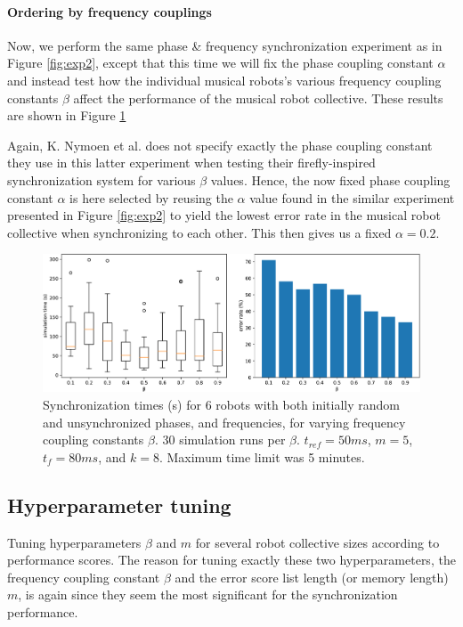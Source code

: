 		
		\paragraph{Ordering by frequency couplings}
		
		Now, we perform the same phase \& frequency synchronization experiment as in Figure \ref{fig:exp2}, except that this time we will fix the phase coupling constant $\alpha$ and instead test how the individual musical robots's various frequency coupling constants $\beta$ affect the performance of the musical robot collective. These results are shown in Figure \ref{fig:exp3}
		
		Again, K. Nymoen et al. does not specify exactly the phase coupling constant they use in this latter experiment when testing their firefly-inspired synchronization system for various $\beta$ values. Hence, the now fixed phase coupling constant $\alpha$ is here selected by reusing the $\alpha$ value found in the similar experiment presented in Figure \ref{fig:exp2} to yield the lowest error rate in the musical robot collective when synchronizing to each other. This then gives us a fixed $\alpha = 0.2$.
		
		\begin{figure}[ht!]
			\centering
			\includegraphics[width=\linewidth]{Assets/DocSegments/Chapters/ExperimentsAndResults/Figures/PerfScores/experiment3_perfScores.pdf}
			\caption{Synchronization times (s) for 6 robots with both initially random and unsynchronized phases, and frequencies, for varying frequency coupling constants $\beta$. 30 simulation runs per $\beta$. $t_{ref}=50ms$, $m=5$, $t_f=80ms$, and $k=8$. Maximum time limit was 5 minutes.}
			\label{fig:exp3}
		\end{figure}
		
		
	\subsection{Hyperparameter tuning}
	Tuning hyperparameters $\beta$ and $m$ for several robot collective sizes according to performance scores. The reason for tuning exactly these two hyperparameters, the frequency coupling constant $\beta$ and the error score list length (or memory length) $m$, is again since they seem the most significant for the synchronization performance.